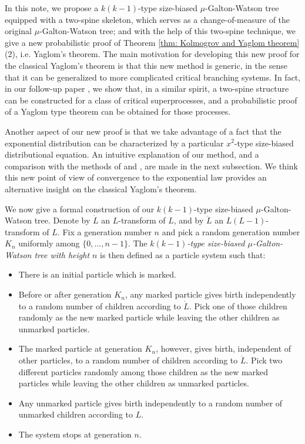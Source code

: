 \documentclass[12pt,a4paper]{amsart}
\numberwithin{equation}{section}
\begin{document}
	In this note, we propose a $k(k-1)$-type size-biased $\mu$-Galton-Watson tree equipped with a two-spine skeleton, which serves as a change-of-measure of the original $\mu$-Galton-Watson tree;
	and with the help of this two-spine technique, we give a new probabilistic proof of Theorem \ref{thm: Kolmogrov and Yaglom theorem}(2), i.e. Yaglom's theorem.
	The main motivation for developing this new proof for the classical Yaglom's theorem is that this new method is generic, in the sense that it can be generalized to more complicated critical branching systems.
	In fact, in our	follow-up
	paper \cite{RenSongSun2017Spine}, we show that, in a similar spirit, a two-spine structure can be constructed for a class of critical superprocesses, and a probabilistic proof of a Yaglom type theorem can be obtained for those processes.



	Another aspect of our new proof is that we take advantage of a fact that the exponential distribution can be characterized by a particular $x^2$-type size-biased distributional equation.
	An intuitive explanation of our method,
and a comparison with the methods of \cite{geiger2000new} and \cite{lyons1995conceptual}, are
	made in the next subsection.
	We think this new point of view of convergence to the exponential law provides an alternative insight on the classical Yaglom's theorem.

	We now give a formal construction of our $k(k-1)$-type size-biased $\mu$-Galton-Watson tree.
	Denote by $\dot L$ an $L$-transform of $L$, and by $\ddot L$ an $L(L-1)$-transform of $L$.
	Fix a generation number $n$ and pick a random generation number $K_n$ uniformly among $\{0,\dots,n-1\}$.
	The \emph{$k(k-1)$-type size-biased $\mu$-Galton-Watson tree with height $n$} is then defined as a particle system such that:
\begin{itemize}
\item
	There is an initial particle which is marked.
\item
	Before or after generation $K_n$, any marked particle gives birth independently to a random number of children according to $\dot L$.
	Pick one of those children randomly as the new marked particle while leaving the other children as unmarked particles.
\item
	The marked particle at generation $K_n$, however, gives birth, independent of other particles, to a random number of children according to $\ddot L$.
	Pick two different particles randomly among those children as the new marked particles while leaving the other children as unmarked particles.
\item
	Any unmarked particle gives birth independently to a random number of unmarked children according to $L$.
\item
	The system stops at generation $n$.
\end{itemize}
\end{document}
